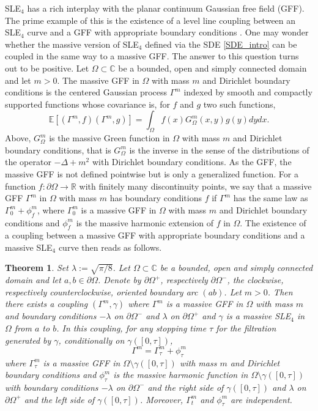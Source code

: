 \documentclass{article}
\newcommand{\EE}{{\mathbb{E}}}
\newtheorem{theorem}{Theorem}[section]
\theoremstyle{definition}
\theoremstyle{remark}
\theoremstyle{remark}
\begin{document}
SLE$_4$ has a rich interplay with the planar continuum Gaussian free field (GFF). The prime example of this is the existence of a level line coupling between an SLE$_4$ curve and a GFF with appropriate boundary conditions \cite{Dub_SLE, IG_1}. One may wonder whether the massive version of SLE$_4$ defined via the SDE \eqref{SDE_intro} can be coupled in the same way to a massive GFF. The answer to this question turns out to be positive. Let $\Omega \subset \mathbb{C}$ be a bounded, open and simply connected domain and let $m >0$. The massive GFF in $\Omega$ with mass $m$ and Dirichlet boundary conditions is the centered Gaussian process $\Gamma^m$ indexed by smooth and compactly supported functions whose covariance is, for $f$ and $g$ two such functions,
\begin{equation*}
    \EE[(\Gamma^m,f)(\Gamma^m,g)] = \int_{\Omega} f(x)G_{\Omega}^m(x,y)g(y) dydx.
\end{equation*}
Above, $G_{\Omega}^m$ is the massive Green function in $\Omega$ with mass $m$ and Dirichlet boundary conditions, that is $G_{\Omega}^m$ is the inverse in the sense of the distributions of the operator $-\Delta+m^2$ with Dirichlet boundary conditions. As the GFF, the massive GFF is not defined pointwise but is only a generalized function. For a function $f: \partial \Omega \to \mathbb{R}$ with finitely many discontinuity points, we say that a massive GFF $\Gamma^m$ in $\Omega$ with mass $m$ has boundary conditions $f$ if $\Gamma^m$ has the same law as $\Gamma_0^m + \phi_{f}^m$, where $\Gamma_0^m$ is a massive GFF in $\Omega$ with mass $m$ and Dirichlet boundary conditions and $\phi_f^m$ is the massive harmonic extension of $f$ in $\Omega$. The existence of a coupling between a massive GFF with appropriate boundary conditions and a massive SLE$_4$ curve then reads as follows.

\begin{theorem} \label{coupling_intro}
Set $\lambda := \sqrt{\pi/8}$. Let $\Omega \subset \mathbb{C}$ be a bounded, open and simply connected domain and let $a, b \in \partial \Omega$. Denote by $\partial \Omega^{+}$, respectively $\partial \Omega^{-}$, the clockwise, respectively counterclockwise, oriented boundary arc $(ab)$. Let $m > 0$. Then there exists a coupling $(\Gamma^m, \gamma)$ where $\Gamma^m$ is a massive GFF in $\Omega$ with mass $m$ and boundary conditions $-\lambda$ on $\partial \Omega^{-}$ and $\lambda$ on $\partial \Omega^{+}$ and $\gamma$ is a massive SLE$_4$ in $\Omega$ from $a$ to $b$. In this coupling, for any stopping time $\tau$ for the filtration generated by $\gamma$, conditionally on $\gamma([0,\tau])$,
\begin{equation*}
    \Gamma^m = \Gamma^m_{\tau} + \phi_{\tau}^m
\end{equation*}
where $\Gamma_{\tau}^m$ is a massive GFF in $\Omega \setminus \gamma([0,\tau])$ with mass $m$ and Dirichlet boundary conditions and $\phi_{\tau}^m$ is the massive harmonic function in $\Omega \setminus \gamma([0,\tau])$ with boundary conditions $-\lambda$ on $\partial \Omega^{-}$ and the right side of $\gamma([0,\tau])$ and $\lambda$ on $\partial \Omega^{+}$ and the left side of $\gamma([0,\tau])$. Moreover, $\Gamma_t^m$ and $\phi_{\tau}^m$ are independent.   
\end{theorem}
\end{document}
